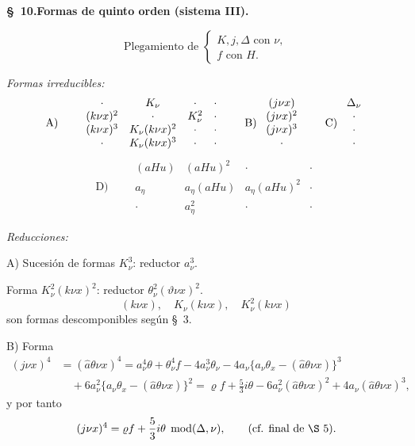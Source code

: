 \documentclass[11pt]{article}
\newcommand{\A}{\Delta}
\newcommand{\R}{\varrho}
\newcommand{\hata}{\widehat{a}}
\newcommand{\modu}[1]{\;\operatorname{mod} #1}
\begin{document}
\begin{center}
\textbf{\S\ 10.\quad Formas de quinto orden (sistema III).}
\end{center}

\[
\text{Plegamiento de }\left\{\begin{array}{l}
K,j,\A \text{ con }\nu,\\
f\text{ con }H.
\end{array}\right.
\]

\noindent\emph{Formas irreducibles:}
\[
\begin{array}{c@{\qquad}c@{\qquad}c@{\qquad}c}
\text{A)} & \begin{array}{cccc}
\cdot&K_\nu&\cdot&\cdot\\
(k\nu x)^2&\cdot&K_\nu^2&\cdot\\
(k\nu x)^3&K_\nu(k\nu x)^2&\cdot&\cdot\\
\cdot&K_\nu(k\nu x)^3&\cdot&\cdot
\end{array}
&
\text{B)}\ \begin{array}{c}(j\nu x)\\(j\nu x)^2\\(j\nu x)^3\\ \cdot\end{array}
&
\text{C)}\ \begin{array}{c}\A_\nu\\\cdot\\\cdot\\\cdot\end{array}
\end{array}
\]
\[
\text{D)}\qquad
\begin{array}{cccc}
(aHu)&(aHu)^2&\cdot&\cdot\\
a_\eta&a_\eta(aHu)&a_\eta(aHu)^2&\cdot\\
\cdot&a_\eta^2&\cdot&\cdot
\end{array}
\]

\noindent\emph{Reducciones:}

\noindent A) Sucesión de formas $K_\nu^3$: reductor $a_\nu^3$.

Forma $K_\nu^2(k\nu x)^2$: reductor $\theta_\nu^2(\vartheta\nu x)^2$.
\[
(k\nu x),\quad K_\nu(k\nu x),\quad K_\nu^2(k\nu x)
\]
son formas descomponibles según \S\ 3.

\noindent B) Forma
\[
\begin{aligned}
(j\nu x)^4&=(\hata\theta\nu x)^4
=a_\nu^4\theta+\theta_\nu^4 f-4a_\nu^3\theta_\nu
-4a_\nu\{a_\nu\theta_x-(\hata\theta\nu x)\}^3\\
&\quad+6a_\nu^2\{a_\nu\theta_x-(\hata\theta\nu x)\}^2
=\R f+\frac53 i\theta-6a_\nu^2(\hata\theta\nu x)^2
+4a_\nu(\hata\theta\nu x)^3,
\end{aligned}
\]
y por tanto
\[
(j\nu x)^4=\R f+\frac53 i\theta\modu{(\A,\nu)},\qquad (\text{cf. final de \S\ 5}).
\]
\end{document}
